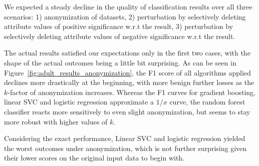 \documentclass[a4paper,twoside]{article}
\begin{document}
We expected a steady decline in the quality of classification results over all three scenarios: 1) anonymization of datasets, 2) perturbation by selectively deleting attribute values of positive significance w.r.t the result, 3) perturbation by selectively deleting attribute values of negative significance w.r.t the result.

The actual results satisfied our expectations only in the first two cases, with the shape of the actual outcomes being a little bit surprising. As can be seen in Figure~\ref{fig:adult_results_anonymization}, the F1 score of all algorithms applied declines more drastically at the beginning, with more benign further losses as the $k$-factor of anonymization increases. Whereas the F1 curves for gradient boosting, linear SVC and logistic regression approximate a $1/x$ curve, the random forest classifier reacts more sensitively to even slight anonymization, but seems to stay more robust with higher values of $k$.

Considering the exact performance, Linear SVC and logistic regression yielded the worst outcomes under anonymization, which is not further surprising given their lower scores on the original input data to begin with.
\end{document}
